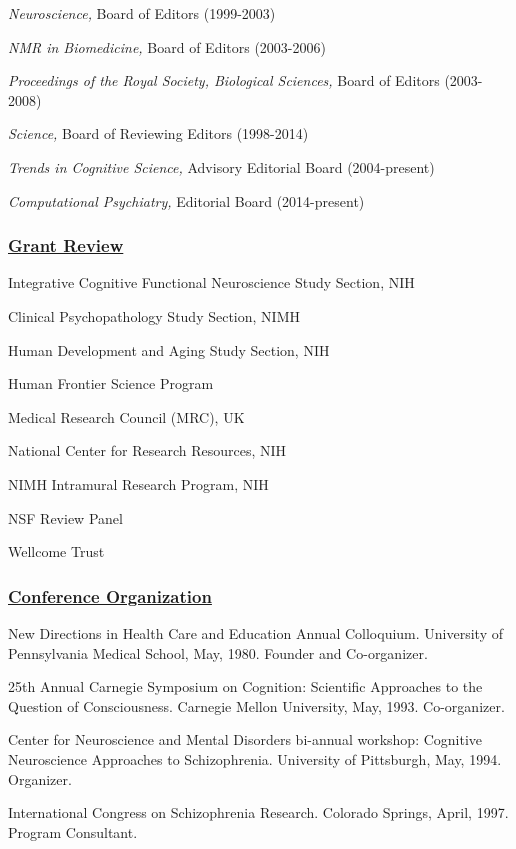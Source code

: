 \documentclass[10 pt]{article}
\begin{document}
\textit{Neuroscience,} Board of Editors (1999-2003)

\textit{NMR in Biomedicine,} Board of Editors (2003-2006)

\textit{Proceedings of the Royal Society, Biological Sciences,} Board of Editors (2003-2008)

\textit{Science,} Board of Reviewing Editors (1998-2014)

\textit{Trends in Cognitive Science,} Advisory Editorial Board (2004-present)

\textit{Computational Psychiatry,} Editorial Board (2014-present)


\subsubsection*{\underline{Grant Review}} \label{secGR}
    \smallskip

Integrative Cognitive Functional Neuroscience Study Section, NIH

Clinical Psychopathology Study Section, NIMH

Human Development and Aging Study Section, NIH

Human Frontier Science Program

Medical Research Council (MRC), UK

National Center for Research Resources, NIH

NIMH Intramural Research Program, NIH

NSF Review Panel

Wellcome Trust


\subsubsection*{\underline{Conference Organization}} \label{secCO}
    \smallskip

New Directions in Health Care and Education Annual Colloquium. University of Pennsylvania Medical School, May, 1980. Founder and Co-organizer.

25th Annual Carnegie Symposium on Cognition: Scientific Approaches to the Question of Consciousness. Carnegie Mellon University, May, 1993. Co-organizer.

Center for Neuroscience and Mental Disorders bi-annual workshop: Cognitive Neuroscience Approaches to Schizophrenia. University of Pittsburgh, May, 1994. Organizer.

International Congress on Schizophrenia Research. Colorado Springs, April, 1997. Program Consultant.
\end{document}
